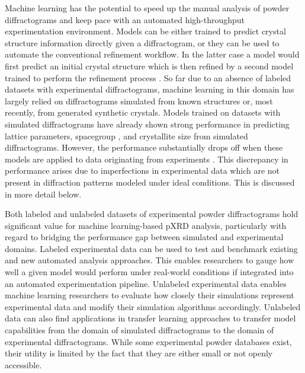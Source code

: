Machine learning has the potential to speed up the manual analysis of powder diffractograms and keep pace with an automated high-throughput experimentation environment\cite{Agrawal2019, Surdu2023}.
Models can be either trained to predict crystal structure information directly given a diffractogram, or they can be used to automate the conventional refinement workflow. In the latter case a model would first predict an initial crystal structure \cite{Surdu2023} which is then refined by a second model trained to perform the refinement process \cite{Feng2019}. So far due to an absence of labeled datasets with experimental diffractograms\cite{Wang2020}, machine learning in this domain has largely relied on diffractograms simulated from known structures\cite{Park2017, Lee2023} or, most recently, from generated synthetic crystals\cite{Schopmans2023}. 
Models trained on datasets with simulated diffractograms have already shown strong performance in predicting lattice parameters\cite{Dong2021, Chitturi2021, Habershon2004, zhang2024crystallographic}, spacegroup \cite{cao2024simxrd, Schopmans2023, Oviedo2018, Park2017, Vecsei2018, Zaloga2020, Suzuki2020, Chakraborty2021,zhang2024crystallographic}, and crystallite size \cite{Dong2021, Chakraborty2021} from simulated diffractograms.
However, the performance substantially drops off when these models are applied to data originating from experiments \cite{cao2024simxrd, Schopmans2023,zhang2024crystallographic, Wang2020, Vecsei2018}. This discrepancy in performance arises due to imperfections in experimental data which are not present in diffraction patterns modeled under ideal conditions. This is discussed in more detail below.

Both labeled and unlabeled datasets of experimental powder diffractograms hold significant value for machine learning-based pXRD analysis, particularly with regard to bridging the performance gap between simulated and experimental domains. Labeled experimental data can be used to test and benchmark existing and new automated analysis approaches. This enables researchers to gauge how well a given model would perform under real-world conditions if integrated into an automated experimentation pipeline. Unlabeled experimental data enables machine learning researchers to evaluate how closely their simulations represent experimental data and modify their simulation algorithms accordingly. Unlabeled data can also find applications in transfer learning approaches to transfer model capabilities from the domain of simulated diffractograms to the domain of experimental diffractograms. While some experimental powder databases exist, their utility is limited by the fact that they are either small or not openly accessible.

